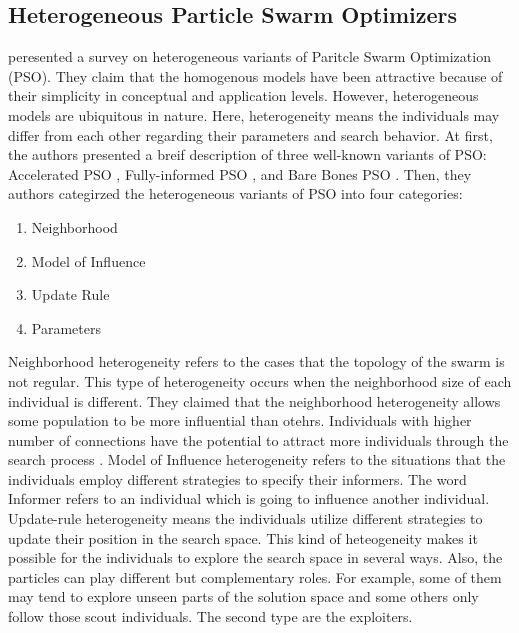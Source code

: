 \subsection{Heterogeneous Particle Swarm Optimizers}
\citet{de2009heterogeneous} peresented a survey on heterogeneous variants of Paritcle Swarm Optimization (PSO). They claim that the homogenous models have been attractive because of their simplicity in conceptual and application levels. However, heterogeneous models are ubiquitous in nature. Here, heterogeneity means the individuals may differ from each other regarding their parameters and search behavior. \newline 
At first, the authors presented a breif description of three well-known variants of PSO: Accelerated PSO \citet{zhang2003adaptive}, Fully-informed PSO \citet{mendes2004fully}, and Bare Bones PSO \citet{kennedy2003bare}. Then, they authors categirzed the heterogeneous variants of PSO into four categories:
\begin{enumerate}
	\item Neighborhood
	\item Model of Influence
	\item Update Rule
	\item Parameters
\end{enumerate}
Neighborhood heterogeneity refers to the cases that the topology of the swarm is not regular. This type of heterogeneity occurs when the neighborhood size of each individual is different. They claimed that the neighborhood heterogeneity allows some population to be more influential than otehrs. Individuals with higher number of connections have the potential to attract more individuals through the search process \citet{kennedy2001swarm}.\newline
Model of Influence heterogeneity refers to the situations that the individuals employ different strategies to specify their informers. The word Informer refers to an individual which is going to influence another individual.\newline
Update-rule heterogeneity means the individuals utilize different strategies to update their position in the search space. This kind of heteogeneity makes it possible for the individuals to explore the search space in several ways. Also, the particles can play different but complementary roles. For example, some of them may tend to explore unseen parts of the solution space and some others only follow those scout individuals. The second type are the exploiters.\newline

